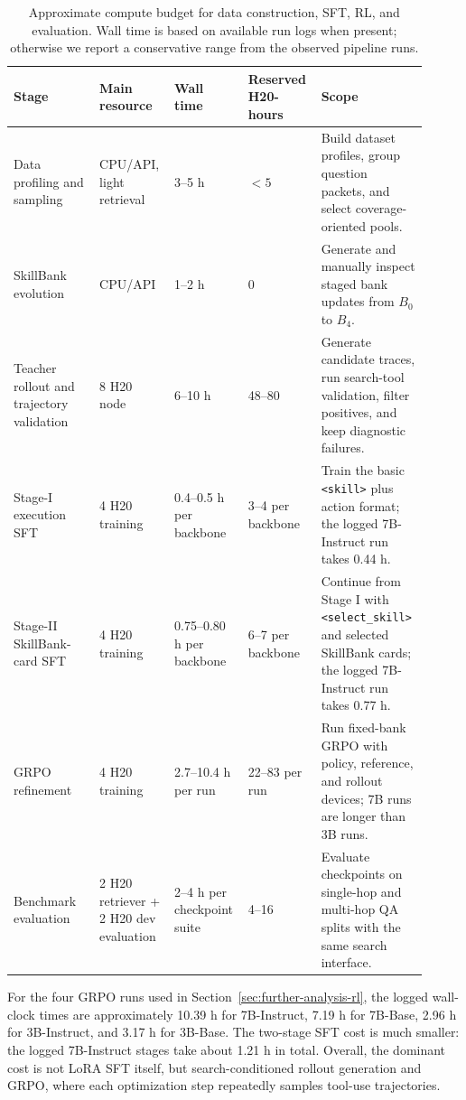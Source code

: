 \documentclass{article}
\newcommand{\tagopen}[2]{\texttt{\textcolor{#1}{<#2>}}}
\begin{document}
\begin{table}[tbp]
  \centering
  \caption{Approximate compute budget for data construction, SFT, RL, and evaluation. Wall time is based on available run logs when present; otherwise we report a conservative range from the observed pipeline runs.}
  \label{tab:appendix-compute-budget}
  \setlength{\tabcolsep}{3pt}
  \renewcommand{\arraystretch}{1.12}
  \scriptsize
  \begin{tabular}{p{0.20\linewidth}p{0.17\linewidth}p{0.16\linewidth}p{0.16\linewidth}p{0.22\linewidth}}
    \toprule
    \textbf{Stage} & \textbf{Main resource} & \textbf{Wall time} & \textbf{Reserved H20-hours} & \textbf{Scope} \\
    \midrule
    Data profiling and sampling & CPU/API, light retrieval & 3--5 h & \(<5\) & Build dataset profiles, group question packets, and select coverage-oriented pools. \\
    SkillBank evolution & CPU/API & 1--2 h & 0 & Generate and manually inspect staged bank updates from \(B_0\) to \(B_4\). \\
    Teacher rollout and trajectory validation & 8 H20 node & 6--10 h & 48--80 & Generate candidate traces, run search-tool validation, filter positives, and keep diagnostic failures. \\
    Stage-I execution SFT & 4 H20 training & 0.4--0.5 h per backbone & 3--4 per backbone & Train the basic \tagopen{skilltagcolor}{skill} plus action format; the logged 7B-Instruct run takes 0.44 h. \\
    Stage-II SkillBank-card SFT & 4 H20 training & 0.75--0.80 h per backbone & 6--7 per backbone & Continue from Stage I with \tagopen{selecttagcolor}{select\_skill} and selected SkillBank cards; the logged 7B-Instruct run takes 0.77 h. \\
    GRPO refinement & 4 H20 training & 2.7--10.4 h per run & 22--83 per run & Run fixed-bank GRPO with policy, reference, and rollout devices; 7B runs are longer than 3B runs. \\
    Benchmark evaluation & 2 H20 retriever + 2 H20 dev evaluation & 2--4 h per checkpoint suite & 4--16 & Evaluate checkpoints on single-hop and multi-hop QA splits with the same search interface. \\
    \bottomrule
  \end{tabular}
\end{table}

For the four GRPO runs used in Section~\ref{sec:further-analysis-rl}, the logged wall-clock times are approximately 10.39 h for 7B-Instruct, 7.19 h for 7B-Base, 2.96 h for 3B-Instruct, and 3.17 h for 3B-Base. The two-stage SFT cost is much smaller: the logged 7B-Instruct stages take about 1.21 h in total. Overall, the dominant cost is not LoRA SFT itself, but search-conditioned rollout generation and GRPO, where each optimization step repeatedly samples tool-use trajectories.
\end{document}

